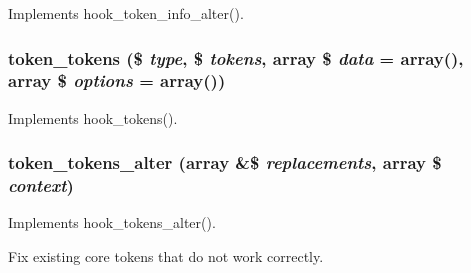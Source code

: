 \label{token_8tokens_8inc_ad634dc57d9d19bb21135a670ef40e95f}
Implements hook\_\-token\_\-info\_\-alter(). \hypertarget{token_8tokens_8inc_a2de5011f4dbf53434a231c973af2b73d}{
\subsubsection[{token\_\-tokens}]{\setlength{\rightskip}{0pt plus 5cm}token\_\-tokens (\$ {\em type}, \/  \$ {\em tokens}, \/  array \$ {\em data} = {\ttfamily array()}, \/  array \$ {\em options} = {\ttfamily array()})}}
\label{token_8tokens_8inc_a2de5011f4dbf53434a231c973af2b73d}
Implements hook\_\-tokens(). \hypertarget{token_8tokens_8inc_ac238d7743df5e0b29418569a4aa88ab9}{
\subsubsection[{token\_\-tokens\_\-alter}]{\setlength{\rightskip}{0pt plus 5cm}token\_\-tokens\_\-alter (array \&\$ {\em replacements}, \/  array \$ {\em context})}}
\label{token_8tokens_8inc_ac238d7743df5e0b29418569a4aa88ab9}
Implements hook\_\-tokens\_\-alter().

Fix existing core tokens that do not work correctly. 